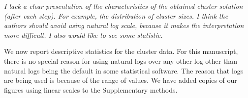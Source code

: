 \documentclass[11pt, oneside]{article}   	%
\begin{document}
\emph{I lack a clear presentation of the characteristics of the obtained cluster solution (after each step). For example, the distribution of cluster sizes. I think the authors should avoid using natural log scale, because it makes the interpretation more difficult. I also would like to see some statistic.}

We now report descriptive statistics for the cluster data. For this manuscript, there is no special reason for using natural logs over any other log other than natural logs being the default in some statistical software. The reason that logs are being used is because of the range of values. We have added copies of our figures using linear scales to the Supplementary methods. 

\vspace{4 mm}
\end{document}

